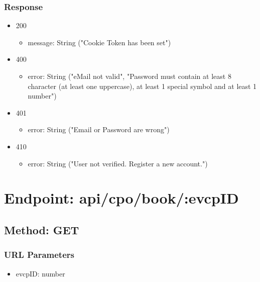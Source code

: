 \subsubsection*{Response}
\begin{itemize}
    \item 200
          \begin{itemize}
              \item message: String ("Cookie Token has been set")
          \end{itemize}
    \item 400
          \begin{itemize}
              \item error: String ("eMail not valid", "Password must contain at least 8 character (at least one uppercase), at least 1 special symbol and at least 1 number")
          \end{itemize}
    \item 401
          \begin{itemize}
              \item error: String ("Email or Password are wrong")
          \end{itemize}
    \item 410
          \begin{itemize}
              \item error: String ("User not verified. Register a new account.")
          \end{itemize}
\end{itemize}

\section*{Endpoint: api/cpo/book/:evcpID}
\subsection*{Method: GET}
\subsubsection*{URL Parameters}
\begin{itemize}
    \item evcpID: number
\end{itemize}
